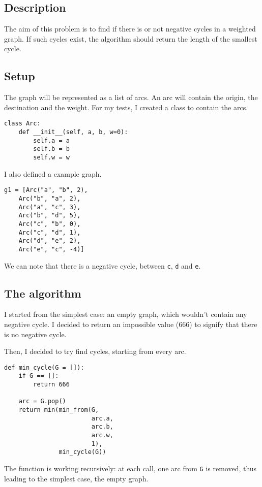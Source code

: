     \subsection{Description}
        The aim of this problem is to find if there is or not negative cycles in a weighted graph.
        If such cycles exist, the algorithm should return the length of the smallest cycle.

    \subsection{Setup}
    \label{sec:2_setup}
        The graph will be represented as a list of arcs. An arc will contain the origin, the destination and the weight. For my tests, I created a class to contain the arcs.

         \begin{lstlisting}
class Arc:
    def __init__(self, a, b, w=0):
        self.a = a
        self.b = b
        self.w = w
        \end{lstlisting}

        I also defined a example graph.
        \begin{lstlisting}
g1 = [Arc("a", "b", 2),
    Arc("b", "a", 2),
    Arc("a", "c", 3),
    Arc("b", "d", 5),
    Arc("c", "b", 0),
    Arc("c", "d", 1),
    Arc("d", "e", 2),
    Arc("e", "c", -4)]
        \end{lstlisting}
        We can note that there is a negative cycle, between \verb|c|, \verb|d| and \verb|e|.

    \subsection{The algorithm}
        I started from the simplest case: an empty graph, which wouldn't contain any negative cycle. I decided to return an impossible value ($666$) to signify that there is no negative cycle.

        Then, I decided to try find cycles, starting from every arc.
        \begin{lstlisting}
def min_cycle(G = []):
    if G == []:
        return 666

    arc = G.pop()
    return min(min_from(G,
                        arc.a,
                        arc.b,
                        arc.w,
                        1),
               min_cycle(G))
        \end{lstlisting}
        The function is working recursively: at each call, one arc from \verb|G| is removed, thus leading to the simplest case, the empty graph.

